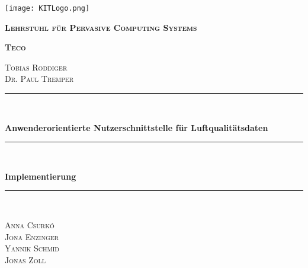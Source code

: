 \begin{titlepage}
    \centering
    \texttt{[image: KITLogo.png]}\par\vspace{1cm}
        {\scshape \bfseries Lehrstuhl für Pervasive Computing Systems\par}
        {\scshape \bfseries Teco\par}
        \vspace{0.25cm}
        {\scshape Tobias Röddiger\\Dr. Paul Tremper\par}
        \vspace{1.5cm}
  
      \newcommand{\HRule}{\rule{\linewidth}{0.5mm}}
      {\color{mintgreen}\HRule} \\[0.4cm]
        {\huge \bfseries \LARGE Anwenderorientierte Nutzerschnittstelle für Luftqualitätsdaten\par}
        {\color{mintgreen}\HRule} \\[0.4cm]
        {
            \huge \bfseries \LARGE Implementierung \par
        }
        {\color{mintgreen}\HRule} \\[1cm]
        \vspace{2cm}
        {\scshape \Large Anna Csurkó\\Jona Enzinger\\Yannik Schmid\\Jonas Zoll\par}
        \vfill
  
  \end{titlepage}
  